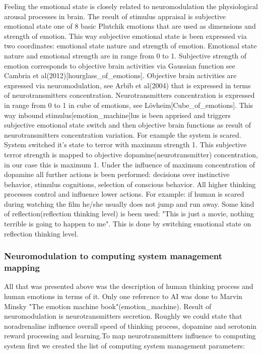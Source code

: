 Feeling the emotional state is closely related to neuromodulation the physiological arousal processes in brain. The result of stimulus appraisal is subjective emotional state one of 8 basic Plutchik emotions that are used as dimensions and strength of emotion. This way subjective emotional state is been expressed via two coordinates: emotional state nature and strength of emotion. Emotional state nature and emotional strength are in range from 0 to 1. Subjective strength of emotion corresponds to objective brain activities via Gaussian function see Cambria et al(2012)[hourglass_of_emotions]. Objective brain activities are expressed via neuromodulation, see Arbib et al(2004) that is expressed in terms of neurotransmitters concentration. Neurotransmitters  concentration is expressed in range from 0 to 1 in cube of emotions, see Lövheim[Cube_of_emotions]. This way inbound stimulus[emotion_machine]lus is been apprised and triggers subjective emotional state switch and then objective brain functions as result of neurotransmitters concentration variation. For example the system is scared. System switched it's state to terror with maximum strength 1. This subjective terror strength is mapped to objective dopamine(neurotransmitter) concentration, in our case this is maximum 1. Under the influence of maximum concentration of dopamine all further actions is been performed: decisions over instinctive behavior, stimulus cognitions, selection of conscious behavior. All higher thinking processes control and influence lower actions. For example: if human is scared during watching the film he/she usually does not jump and run away. Some kind of reflection(reflection thinking level) is been used: "This is just a movie, nothing terrible is going to happen to me". This is done by switching emotional state on reflection thinking level.

\subsubsection{Neuromodulation to computing system management mapping}

All that was presented above was the description of human thinking process and human emotions in terms of it. Only one reference to AI was done to Marvin Minsky "The emotion machine book"(emotion_machine). Result of neuromodulation is neurotransmitters secretion. Roughly we could state that noradrenaline influence overall speed of thinking process, dopamine and serotonin reward processing and learning.To map neurotransmitters influence to computing system first we created the list of computing system management parameters:

